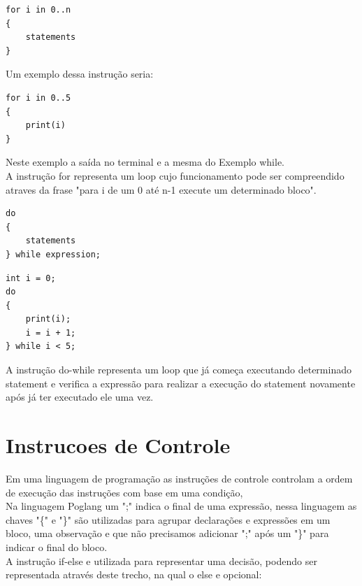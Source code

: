 \documentclass[12pt, letterpaper]{article}
\newcommand\tab[1][1cm]{\hspace*{#1}}
\begin{document}
\begin{lstlisting}[caption=Forma geral do for]
for i in 0..n
{
    statements
}
\end{lstlisting}

Um exemplo dessa instrução seria:

\begin{lstlisting}[caption=Exemplo for]
for i in 0..5 
{
    print(i)
}
\end{lstlisting}

\begin{spacing}{1.5}
\end{spacing}

\tab Neste exemplo a saída no terminal e a mesma do Exemplo while.\\[1.0mm]
\tab A instrução for representa um loop cujo funcionamento pode ser compreendido 
atraves da frase "para i de um 0 até n-1 execute um determinado bloco".

\begin{spacing}{1.5}
\end{spacing}

\begin{lstlisting}[caption=Forma geral do do-while]
do
{
    statements
} while expression;
\end{lstlisting}

\begin{lstlisting}[caption=Exemplos do-while]
int i = 0;
do
{
    print(i);
    i = i + 1;
} while i < 5;
\end{lstlisting}

\begin{spacing}{1.5}
\end{spacing}

\tab A instrução do-while representa um loop que já começa executando 
determinado statement e verifica a expressão para realizar a execução do
statement novamente após já ter executado ele uma vez.

\section{Instrucoes de Controle}
\tab Em uma linguagem de programação as instruções de controle controlam a 
ordem de execução das instruções com base em uma condição,\\[1.0mm]
\tab Na linguagem Poglang um ";" indica o final de uma expressão, nessa linguagem
as chaves "\{" e "\}" são utilizadas para agrupar declarações e expressões
em um bloco, uma observação e que não precisamos adicionar ";" após um "\}" 
para indicar o final do bloco.\\[1.0mm]
\tab A instrução if-else e utilizada para representar uma decisão, podendo ser
representada através deste trecho, na qual o else e opcional:
\end{document}
